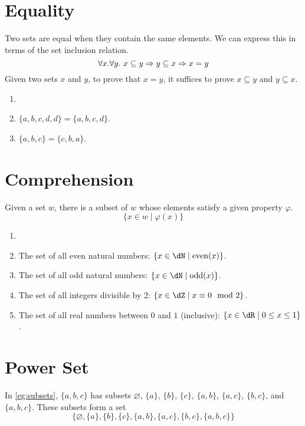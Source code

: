 \documentclass[article,10pt,oneside]{memoir}
\begin{document}
\section{Equality}
\label{sec:equality}

Two sets are equal when they contain the same elements.
We can express this in terms of the set inclusion relation.
\[
  \forall x. \forall y.~x \subseteq y \Rightarrow y \subseteq x \Rightarrow x = y
\]
Given two sets $x$ and $y$, to prove that $x = y$, it suffices to prove $x \subseteq y$ and $y \subseteq x$.

\begin{eg}
  \begin{enumerate}
  \item[]
  \item $\{a,b,c,d,d\} = \{a,b,c,d\}$.
  \item $\{a,b,c\} = \{c,b,a\}$.
  \end{enumerate}
\end{eg}

\section{Comprehension}
\label{sec:comprehension}

Given a set $w$, there is a subset of $w$ whose elements satisfy a given property $\varphi$.
\[
  \{ x \in w \mid \varphi(x) \}
\]

\begin{eg}
  \begin{enumerate}
  \item[]
  \item The set of all even natural numbers: $\{ x \in \dN \mid \mathrm{even}(x) \}$.
  \item The set of all odd natural numbers: $\{ x \in \dN \mid \mathrm{odd}(x) \}$.
  \item The set of all integers divisible by 2: $\{ x \in \dZ \mid x \cng 0 \mod 2 \}$.
  \item The set of all real numbers between $0$ and $1$ (inclusive): $\{ x \in \dR \mid 0 \leq x \leq 1 \}$.
  \end{enumerate}
\end{eg}

\section{Power Set}
\label{sec:power-set}

In \cref{eg:subsets}, $\{ a,b,c \}$ has subsets $\varnothing$, $\{ a \}$, $\{ b \}$, $\{ c \}$, $\{ a,b \}$, $\{ a,c \}$, $\{ b,c \}$, and $\{ a,b,c \}$.
These subsets form a set
\[
  \{ \varnothing, \{ a \}, \{ b \}, \{ c \}, \{ a,b \}, \{ a,c \}, \{ b,c \}, \{ a,b,c \} \}
\]
\end{document}
